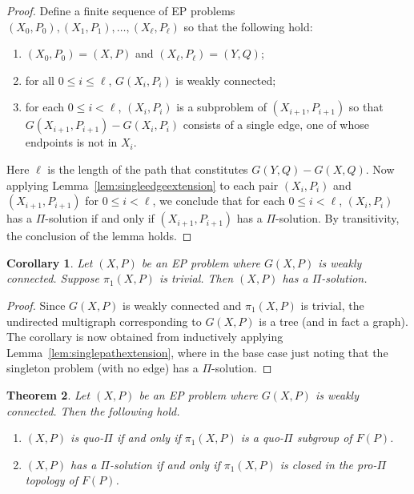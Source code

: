 \documentclass[10pt,a4paper]{amsart}
\newtheorem{theorem}{Theorem}[section]
\newtheorem{corollary}[theorem]{Corollary}
\theoremstyle{definition}
\theoremstyle{definition}
\numberwithin{equation}{section}
\begin{document}
\begin{proof} Define a finite sequence of EP problems $(X_0, P_0), (X_1, P_1), \dots, (X_\ell, P_\ell)$ so that the following hold:
\begin{enumerate}
\item[\rm (i)] $(X_0, P_0)=(X, P)$ and $(X_\ell, P_\ell)=(Y, Q)$;
\item[\rm (ii)] for all $0\leq i\leq \ell$, $G(X_i, P_i)$ is weakly connected;
\item[\rm (iii)] for each $0\leq i<\ell$, $(X_i, P_i)$ is a subproblem of $(X_{i+1}, P_{i+1})$ so that $G(X_{i+1}, P_{i+1})-G(X_i, P_i)$ consists of a single edge, one of whose endpoints is not in $X_i$.
\end{enumerate}
 Here $\ell$ is the length of the path that constitutes $G(Y, Q)-G(X, Q)$. Now applying Lemma~\ref{lem:singleedgeextension} to each pair $(X_i, P_i)$ and $(X_{i+1}, P_{i+1})$ for $0\leq i<\ell$, we conclude that for each $0\leq i<\ell$, $(X_i, P_i)$ has a $\Pi$-solution if and only if $(X_{i+1}, P_{i+1})$ has a $\Pi$-solution. By transitivity, the conclusion of the lemma holds.
\end{proof}


\begin{corollary}\label{cor:trivial} Let $(X, P)$ be an EP problem where $G(X, P)$ is weakly connected. Suppose $\pi_1(X, P)$ is trivial. Then $(X, P)$ has a $\Pi$-solution.
\end{corollary}

\begin{proof} Since $G(X, P)$ is weakly connected and $\pi_1(X, P)$ is trivial, the undirected multigraph corresponding to $G(X, P)$ is a tree (and in fact a graph). The corollary is now obtained from inductively applying Lemma~\ref{lem:singlepathextension}, where in the base case just noting that the singleton problem (with no edge) has a $\Pi$-solution.
\end{proof}



\begin{theorem}\label{thm:solutionprotopology} Let $(X, P)$ be an EP problem where $G(X, P)$ is weakly connected. Then the following hold.
\begin{enumerate}
\item[\rm (i)] $(X, P)$ is quo-$\Pi$ if and only if $\pi_1(X, P)$ is a quo-$\Pi$ subgroup of $F(P)$.
\item[\rm (ii)] $(X, P)$ has a $\Pi$-solution if and only if $\pi_1(X, P)$ is closed in the pro-$\Pi$ topology of $F(P)$.
\end{enumerate}
\end{theorem}
\end{document}
